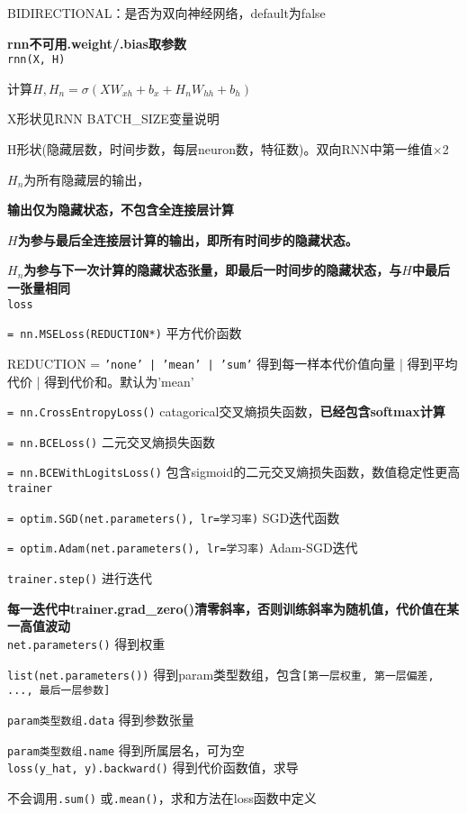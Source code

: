 \documentclass[UTF8]{ctexart}
\begin{document}
  BIDIRECTIONAL：是否为双向神经网络，default为false
  
  \textbf{rnn不可用.weight/.bias取参数}\\
\texttt{rnn(X, H)}

  计算$H, H_n = \sigma(XW_{xh} + b_x + H_nW_{hh} + b_h)$

  \quad X形状见RNN BATCH\_SIZE变量说明

  \quad H形状(隐藏层数，时间步数，每层neuron数，特征数)。双向RNN中第一维值$\times$2

  \quad $H_n$为所有隐藏层的输出，
  
  \textbf{输出仅为隐藏状态，不包含全连接层计算}

  \textbf{$H$为参与最后全连接层计算的输出，即所有时间步的隐藏状态。}
  
  \textbf{$H_n$为参与下一次计算的隐藏状态张量，即最后一时间步的隐藏状态，与$H$中最后一张量相同}\\
\texttt{loss}

  \texttt{= nn.MSELoss(REDUCTION*)} 平方代价函数

  \quad REDUCTION = \texttt{'none' | 'mean' | 'sum'} 得到每一样本代价值向量 | 得到平均代价 | 得到代价和。默认为'mean'

  \texttt{= nn.CrossEntropyLoss()} catagorical交叉熵损失函数，\textbf{已经包含softmax计算}
  
  \texttt{= nn.BCELoss()} 二元交叉熵损失函数
  
  \texttt{= nn.BCEWithLogitsLoss()} 包含sigmoid的二元交叉熵损失函数，数值稳定性更高\\
\texttt{trainer}

  \texttt{= optim.SGD(net.parameters(), lr=学习率)} SGD迭代函数

  \texttt{= optim.Adam(net.parameters(), lr=学习率)} Adam-SGD迭代

  \texttt{trainer.step()} 进行迭代
  
  \textbf{每一迭代中trainer.grad\_zero()清零斜率，否则训练斜率为随机值，代价值在某一高值波动}\\
\texttt{net.parameters()} 得到权重

  \texttt{list(net.parameters())} 得到param类型数组，包含\texttt{[第一层权重, 第一层偏差, ..., 最后一层参数]}
  
  \texttt{param类型数组.data} 得到参数张量
  
  \texttt{param类型数组.name} 得到所属层名，可为空\\
\texttt{loss(y\_hat, y).backward()} 得到代价函数值，求导

  不会调用\texttt{.sum()} 或\texttt{.mean()}，求和方法在loss函数中定义
  
\end{document}
